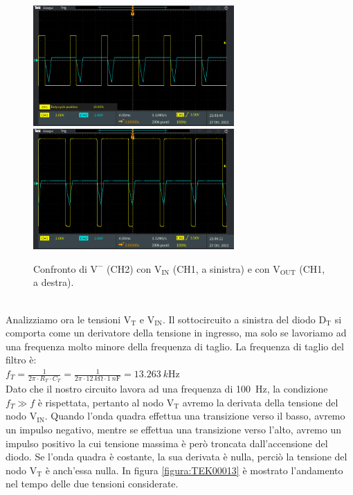 \documentclass{report}
\begin{document}
\begin{figure}[h!]
	\centering
	\includegraphics[height=4.6cm]{immagini/TEK00004}
	\includegraphics[height=4.6cm]{immagini/TEK00005}
	\caption{Confronto di $\mathrm{V^-}$ (CH2) con $\mathrm{V_{IN}}$ (CH1, a sinistra) e con $\mathrm{V_{OUT}}$ (CH1, a destra).}
	\label{figura:TEK00004e5}
\end{figure}
\\Analizziamo ora le tensioni $\mathrm{V_T}$ e $\mathrm{V_{IN}}$. Il sottocircuito a sinistra del diodo $\mathrm{D_T}$ si comporta come un derivatore della tensione in ingresso, ma solo se lavoriamo ad una frequenza molto minore della frequenza di taglio. La frequenza di taglio del filtro è:
\\[4pt]\indent$\displaystyle{f_T = \frac{1}{2\pi\cdot R_T\cdot C_T} = \frac{1}{2\pi\cdot \SI{12}{k\ohm}\cdot\SI{1}{n\farad}} =\SI{13.263}{k\hertz}}$
\\[8pt]Dato che il nostro circuito lavora ad una frequenza di \SI{100}{\hertz}, la condizione $f_T\gg f$ è rispettata, pertanto al nodo $\mathrm{V_T}$ avremo la derivata della tensione del nodo $\mathrm{V_{IN}}$. Quando l'onda quadra effettua una transizione verso il basso, avremo un impulso negativo, mentre se effettua una transizione verso l'alto, avremo un impulso positivo la cui tensione massima è però troncata dall'accensione del diodo. Se l'onda quadra è costante, la sua derivata è nulla, perciò la tensione del nodo $\mathrm{V_T}$ è anch'essa nulla. In figura \ref{figura:TEK00013} è mostrato l'andamento nel tempo delle due tensioni considerate. 
\end{document}
